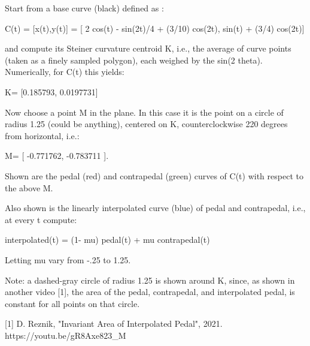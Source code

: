 Start from a base curve (black) defined as :

C(t) = [x(t),y(t)] = [ 2 cos(t) - sin(2t)/4 + (3/10) cos(2t), sin(t) + (3/4) cos(2t)]

and compute its Steiner curvature centroid K, i.e., the average of curve points (taken as a finely sampled polygon), each weighed by the sin(2 theta). Numerically, for C(t) this yields:

K= [0.185793, 0.0197731]

Now choose a point M in the plane. In this case it is the point on a circle of radius 1.25 (could be anything), centered on K, counterclockwise 220 degrees from horizontal, i.e.:

M= [ -0.771762, -0.783711 ].

Shown are the pedal (red) and contrapedal (green) curves of C(t) with respect to the above M.

Also shown is the linearly interpolated curve (blue) of pedal and contrapedal, i.e., at every t compute:

interpolated(t) = (1- mu) pedal(t) + mu contrapedal(t)

Letting mu vary from -.25 to 1.25.

Note: a dashed-gray circle of radius 1.25 is shown around K, since, as shown in another video [1], the area of the pedal, contrapedal, and interpolated pedal, is constant for all points on that circle.

[1] D. Reznik, "Invariant Area of Interpolated Pedal", 2021. https://youtu.be/gR8Axe823_M